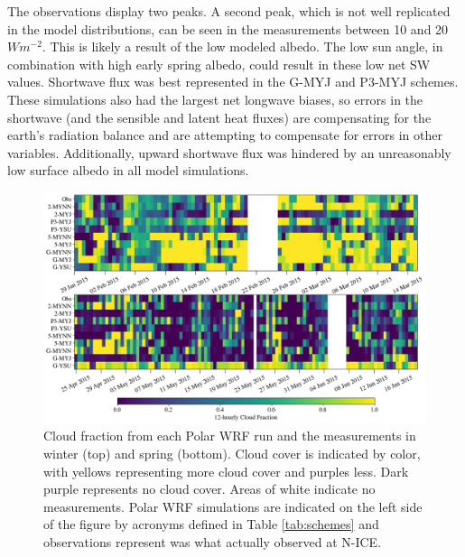The observations display two peaks. A second peak, which is not well replicated in the model distributions, can be seen in the measurements between 10 and 20 $Wm^{-2}$. This is likely a result of the low modeled albedo. The low sun angle, in combination with high early spring albedo, could result in these low net SW values. Shortwave flux was best represented in the G-MYJ and P3-MYJ schemes. These simulations also had the largest net longwave biases, so errors in the shortwave (and the sensible and latent heat fluxes) are compensating for the earth's radiation balance and are attempting to compensate for errors in other variables. Additionally, upward shortwave flux was hindered by an unreasonably low surface albedo in all model simulations.

\begin{figure}[h!]
    \centering \hspace*{-0.5cm}
    \includegraphics[width=1.1\linewidth]{figures/chapter3/WRF_Clouds.png}
    \caption[Polar WRF simulated cloud fraction.]{Cloud fraction from each Polar WRF run and the measurements in winter (top) and spring (bottom). Cloud cover is indicated by color, with yellows representing more cloud cover and purples less. Dark purple represents no cloud cover. Areas of white indicate no measurements. Polar WRF simulations are indicated on the left side of the figure by acronyms defined in Table \ref{tab:schemes} and observations represent was what actually observed at N-ICE.}
\label{fig:wrf_cloudfrac}
\end{figure}

